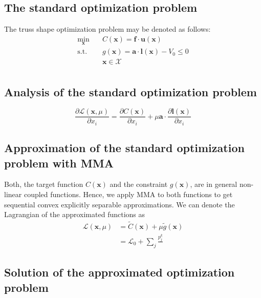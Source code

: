 \subsection{The standard optimization problem}
The truss shape optimization problem may be denoted as follows:
\begin{equation}
    \begin{aligned}
        \min_{\mathbf{x}} \quad & C(\mathbf{x}) = \mathbf{f} \cdot \mathbf{u}(\mathbf{x})\\
        \textrm{s.t.} \quad & g(\mathbf{x}) = \mathbf{a} \cdot \mathbf{l}(\mathbf{x}) - V_0 \le 0  \\
                            & \mathbf{x} \in \mathcal{X}\\
    \end{aligned}
    \label{eq:shape_optimization}
\end{equation}


\subsection{Analysis of the standard optimization problem}

\begin{equation}
    \frac{\partial \mathcal{L} (\mathbf{x}, \mu)}{\partial x_i} 
    = \frac{\partial C (\mathbf{x})}{\partial x_i} + \mu \mathbf{a} \cdot \frac{\partial \mathbf{l}(\mathbf{x})}{\partial x_i}
    \label{eq:lagrange_truss_shape_problem}
\end{equation}

\subsection{Approximation of the standard optimization problem with MMA}

Both, the target function $C(\mathbf{x})$ and the constraint $g(\mathbf{x})$, are in general non-linear coupled functions. Hence, we apply MMA to both functions to get sequential convex explicitly separable approximations. We can denote the Lagrangian of the approximated functions as 
\begin{align}
    \mathcal{L}(\mathbf{x}, \mu) &= \tilde{C}(\mathbf{x}) + \mu \tilde{g}(\mathbf{x}) \\
    &= \mathcal{L}_0 + \sum_j \frac{p_j^k}{}
\end{align}

\subsection{Solution of the approximated optimization problem}


